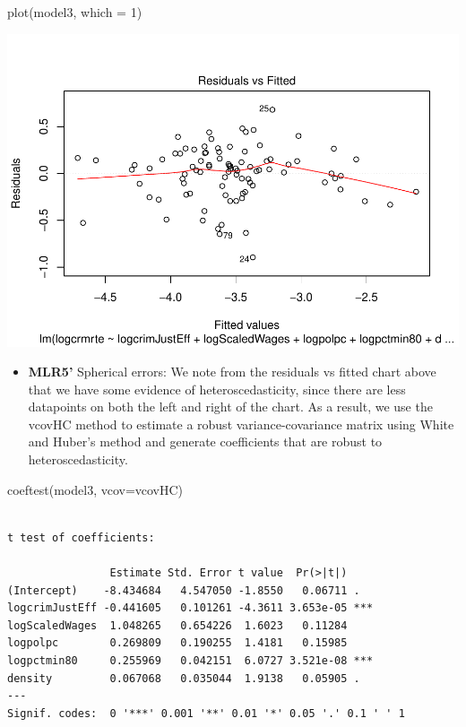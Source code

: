 \documentclass[]{article}
\newenvironment{Shaded}{}{}
\newcommand{\DataTypeTok}[1]{#1}
\newcommand{\DecValTok}[1]{#1}
\newcommand{\KeywordTok}[1]{\textcolor[rgb]{0.00,0.00,1.00}{#1}}
\newcommand{\NormalTok}[1]{#1}
\providecommand{\tightlist}{%
  \setlength{\itemsep}{0pt}\setlength{\parskip}{0pt}}
\begin{document}
\begin{Shaded}
\begin{Highlighting}[]
\KeywordTok{plot}\NormalTok{(model3, }\DataTypeTok{which =} \DecValTok{1}\NormalTok{)}
\end{Highlighting}
\end{Shaded}

\includegraphics{Bagnard_Gaustad_Hartman_Leung_Lab_3_files/figure-latex/unnamed-chunk-85-1.pdf}

\begin{itemize}
\tightlist
\item
  \textbf{MLR5'} Spherical errors: We note from the residuals vs fitted
  chart above that we have some evidence of heteroscedasticity, since
  there are less datapoints on both the left and right of the chart. As
  a result, we use the vcovHC method to estimate a robust
  variance-covariance matrix using White and Huber's method and generate
  coefficients that are robust to heteroscedasticity.
\end{itemize}

\begin{Shaded}
\begin{Highlighting}[]
\KeywordTok{coeftest}\NormalTok{(model3, }\DataTypeTok{vcov=}\NormalTok{vcovHC)}
\end{Highlighting}
\end{Shaded}

\begin{verbatim}

t test of coefficients:

                Estimate Std. Error t value  Pr(>|t|)    
(Intercept)    -8.434684   4.547050 -1.8550   0.06711 .  
logcrimJustEff -0.441605   0.101261 -4.3611 3.653e-05 ***
logScaledWages  1.048265   0.654226  1.6023   0.11284    
logpolpc        0.269809   0.190255  1.4181   0.15985    
logpctmin80     0.255969   0.042151  6.0727 3.521e-08 ***
density         0.067068   0.035044  1.9138   0.05905 .  
---
Signif. codes:  0 '***' 0.001 '**' 0.01 '*' 0.05 '.' 0.1 ' ' 1
\end{verbatim}
\end{document}
